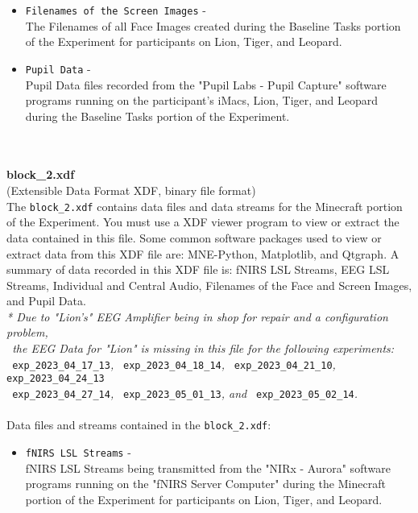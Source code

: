 \begin{description}
\begin{addmargin}[0em]{0em}
\begin{itemize}
        \item \verb|Filenames of the Screen Images| -\\The Filenames of all Face Images created during the Baseline Tasks portion of the Experiment for participants on Lion, Tiger, and Leopard.
        \item \verb|Pupil Data| -\\Pupil Data files recorded from the "Pupil Labs - Pupil Capture" software programs running on the participant's iMacs, Lion, Tiger, and Leopard during the Baseline Tasks portion of the Experiment.
    \end{itemize}


    \textbf{\\\\}
    \textbf{block\_2.xdf}\\(Extensible Data Format XDF, binary file format)\\
    The \verb|block_2.xdf| contains data files and data streams for the Minecraft portion of the Experiment.
    You must use a XDF viewer program to view or extract the data contained in this file.
    Some common software packages used to view or extract data from this XDF file are: MNE-Python, Matplotlib, and Qtgraph.
    A summary of data recorded in this XDF file is: fNIRS LSL Streams, EEG LSL Streams, Individual and Central Audio,
    Filenames of the Face and Screen Images, and Pupil Data.\\
    \textit{* Due to "Lion's" EEG Amplifier being in shop for repair and a configuration problem,}\\
    \verb| |\textit{the EEG Data for "Lion" is missing in this file for the following experiments: }\\
    \verb| exp_2023_04_17_13|\textit{, }\verb| exp_2023_04_18_14|\textit{, }\verb| exp_2023_04_21_10|\textit{, }\verb| exp_2023_04_24_13|\\
    \verb| exp_2023_04_27_14|\textit{, }\verb| exp_2023_05_01_13|\textit{, and }\verb| exp_2023_05_02_14|\textit{.}\\\\
    Data files and streams contained in the \verb|block_2.xdf|:
    \begin{itemize}
        \item \verb|fNIRS LSL Streams| -\\fNIRS LSL Streams being transmitted from the "NIRx - Aurora" software programs running on the "fNIRS Server Computer" during the Minecraft portion of the Experiment for participants on Lion, Tiger, and Leopard.

\end{itemize}
\end{addmargin}
\end{description}
